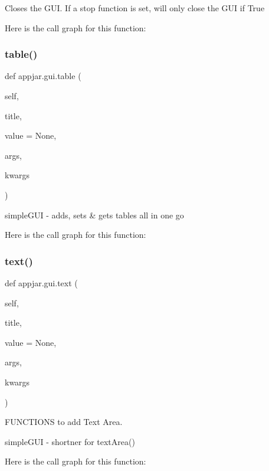 \begin{DoxyVerb}
\begin{DoxyVerb}Closes the GUI. If a stop function is set, will only close the GUI if True \end{DoxyVerb}
 Here is the call graph for this function\+:
\mbox{\label{classappjar_1_1gui_a137fe094086a1e996bdbcb8bb56c20ae}} 
\subsubsection{\texorpdfstring{table()}{table()}}
{\footnotesize\ttfamily def appjar.\+gui.\+table (\begin{DoxyParamCaption}\item[{}]{self,  }\item[{}]{title,  }\item[{}]{value = {\ttfamily None},  }\item[{}]{args,  }\item[{}]{kwargs }\end{DoxyParamCaption})}

\begin{DoxyVerb}simpleGUI - adds, sets & gets tables all in one go \end{DoxyVerb}
 Here is the call graph for this function\+:
\mbox{\label{classappjar_1_1gui_a221b516425bf76dd8560ec9f4818182f}} 
\subsubsection{\texorpdfstring{text()}{text()}}
{\footnotesize\ttfamily def appjar.\+gui.\+text (\begin{DoxyParamCaption}\item[{}]{self,  }\item[{}]{title,  }\item[{}]{value = {\ttfamily None},  }\item[{}]{args,  }\item[{}]{kwargs }\end{DoxyParamCaption})}



F\+U\+N\+C\+T\+I\+O\+NS to add Text Area. 

\begin{DoxyVerb}simpleGUI - shortner for textArea() \end{DoxyVerb}
 Here is the call graph for this function\+:
\mbox{\label{classappjar_1_1gui_a92a960100d96abbccf9bf9dab549f4bf}} 

\end{DoxyVerb}
